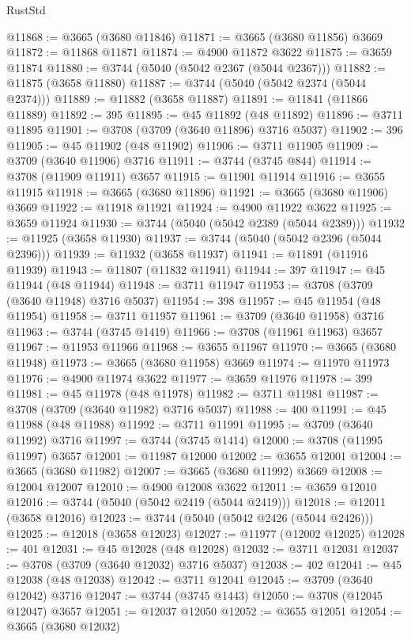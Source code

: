 \begin{lexlean}{RustStd}
\begin{coremodule}
@11868 := @3665 (@3680 @11846)
@11871 := @3665 (@3680 @11856) @3669
@11872 := @11868 @11871
@11874 := @4900 @11872 @3622
@11875 := @3659 @11874
@11880 := @3744 (@5040 (@5042 @2367 (@5044 @2367)))
@11882 := @11875 (@3658 @11880)
@11887 := @3744 (@5040 (@5042 @2374 (@5044 @2374)))
@11889 := @11882 (@3658 @11887)
@11891 := @11841 (@11866 @11889)
@11892 := 395
@11895 := @45 @11892 (@48 @11892)
@11896 := @3711 @11895
@11901 := @3708 (@3709 (@3640 @11896) @3716 @5037)
@11902 := 396
@11905 := @45 @11902 (@48 @11902)
@11906 := @3711 @11905
@11909 := @3709 (@3640 @11906) @3716
@11911 := @3744 (@3745 @844)
@11914 := @3708 (@11909 @11911) @3657
@11915 := @11901 @11914
@11916 := @3655 @11915
@11918 := @3665 (@3680 @11896)
@11921 := @3665 (@3680 @11906) @3669
@11922 := @11918 @11921
@11924 := @4900 @11922 @3622
@11925 := @3659 @11924
@11930 := @3744 (@5040 (@5042 @2389 (@5044 @2389)))
@11932 := @11925 (@3658 @11930)
@11937 := @3744 (@5040 (@5042 @2396 (@5044 @2396)))
@11939 := @11932 (@3658 @11937)
@11941 := @11891 (@11916 @11939)
@11943 := @11807 (@11832 @11941)
@11944 := 397
@11947 := @45 @11944 (@48 @11944)
@11948 := @3711 @11947
@11953 := @3708 (@3709 (@3640 @11948) @3716 @5037)
@11954 := 398
@11957 := @45 @11954 (@48 @11954)
@11958 := @3711 @11957
@11961 := @3709 (@3640 @11958) @3716
@11963 := @3744 (@3745 @1419)
@11966 := @3708 (@11961 @11963) @3657
@11967 := @11953 @11966
@11968 := @3655 @11967
@11970 := @3665 (@3680 @11948)
@11973 := @3665 (@3680 @11958) @3669
@11974 := @11970 @11973
@11976 := @4900 @11974 @3622
@11977 := @3659 @11976
@11978 := 399
@11981 := @45 @11978 (@48 @11978)
@11982 := @3711 @11981
@11987 := @3708 (@3709 (@3640 @11982) @3716 @5037)
@11988 := 400
@11991 := @45 @11988 (@48 @11988)
@11992 := @3711 @11991
@11995 := @3709 (@3640 @11992) @3716
@11997 := @3744 (@3745 @1414)
@12000 := @3708 (@11995 @11997) @3657
@12001 := @11987 @12000
@12002 := @3655 @12001
@12004 := @3665 (@3680 @11982)
@12007 := @3665 (@3680 @11992) @3669
@12008 := @12004 @12007
@12010 := @4900 @12008 @3622
@12011 := @3659 @12010
@12016 := @3744 (@5040 (@5042 @2419 (@5044 @2419)))
@12018 := @12011 (@3658 @12016)
@12023 := @3744 (@5040 (@5042 @2426 (@5044 @2426)))
@12025 := @12018 (@3658 @12023)
@12027 := @11977 (@12002 @12025)
@12028 := 401
@12031 := @45 @12028 (@48 @12028)
@12032 := @3711 @12031
@12037 := @3708 (@3709 (@3640 @12032) @3716 @5037)
@12038 := 402
@12041 := @45 @12038 (@48 @12038)
@12042 := @3711 @12041
@12045 := @3709 (@3640 @12042) @3716
@12047 := @3744 (@3745 @1443)
@12050 := @3708 (@12045 @12047) @3657
@12051 := @12037 @12050
@12052 := @3655 @12051
@12054 := @3665 (@3680 @12032)

\end{coremodule}
\end{lexlean}
